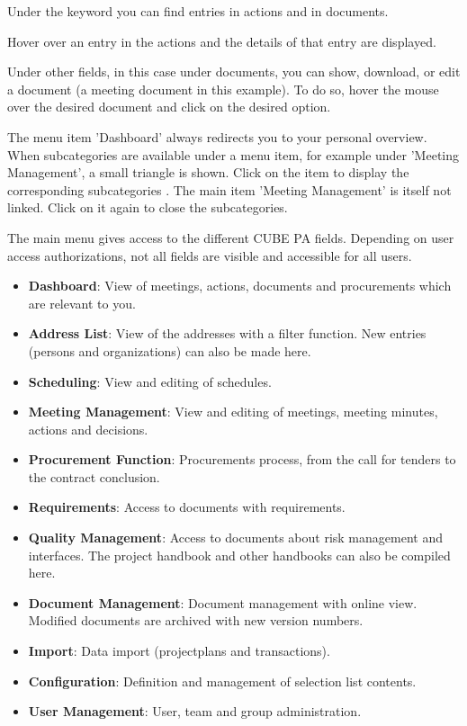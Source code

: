 \begin{compactitem}
	\item Under the keyword you can find entries in actions and in documents.
	\item Hover over an entry in the actions and the details of that entry are displayed.
	\item Under other fields, in this case under documents, you can show, download, or edit a document (a meeting document in this example). To do so, hover the mouse over the desired document and click on the desired option.
\end{compactitem}

\vspace{\baselineskip}

The menu item 'Dashboard'  always redirects you to your personal overview. When subcategories are available under a menu item, for example under 'Meeting Management', a small triangle is shown. Click on the item to display the corresponding subcategories . The main item 'Meeting Management' is itself not linked. Click on it again to close the subcategories.

\vspace{\baselineskip}

The main menu gives access to the different CUBE PA fields. Depending on user access authorizations, not all fields are visible and accessible for all users.

\begin{itemize}
\item
\textbf{Dashboard}: View of meetings, actions, documents and procurements which are relevant to you.
\item
\textbf{Address List}: View of the addresses with a filter function. New entries (persons and organizations) can also be made here.
\item
\textbf{Scheduling}: View and editing of schedules.
\item
\textbf{Meeting Management}: View and editing of meetings, meeting minutes, actions and decisions.
\item
\textbf{Procurement Function}: Procurements process, from the call for tenders to the contract conclusion.
\item
\textbf{Requirements}: Access to documents with requirements.
\item
\textbf{Quality Management}: Access to documents about risk management and interfaces. The project handbook and other handbooks can also be compiled here.
\item
\textbf{Document Management}: Document management with online view. Modified documents are archived with new version numbers.
\item
\textbf{Import}: Data import (projectplans and transactions).
\item
\textbf{Configuration}: Definition and management of selection list contents.
\item
\textbf{User Management}: User, team and group administration.
\end{itemize}


